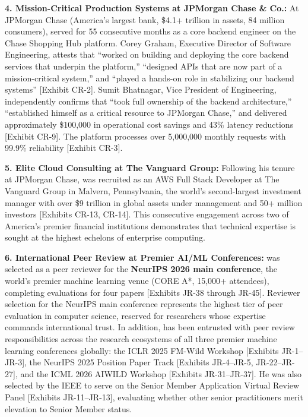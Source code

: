 \textbf{4. Mission-Critical Production Systems at JPMorgan Chase \& Co.:} At JPMorgan Chase (America's largest bank, \$4.1+ trillion in assets, 84 million consumers), \dr served for 55 consecutive months as a core backend engineer on the Chase Shopping Hub platform. Corey Graham, Executive Director of Software Engineering, attests that \dr ``worked on building and deploying the core backend services that underpin the platform,'' ``designed APIs that are now part of a mission-critical system,'' and ``played a hands-on role in stabilizing our backend systems'' [Exhibit CR-2]. Sumit Bhatnagar, Vice President of Engineering, independently confirms that \dr ``took full ownership of the backend architecture,'' ``established himself as a critical resource to JPMorgan Chase,'' and delivered approximately \$100,000 in operational cost savings and 43\% latency reductions [Exhibit CR-9]. The platform processes over 5,000,000 monthly requests with 99.9\% reliability [Exhibit CR-3].

\textbf{5. Elite Cloud Consulting at The Vanguard Group:} Following his tenure at JPMorgan Chase, \dr was recruited as an AWS Full Stack Developer at The Vanguard Group in Malvern, Pennsylvania, the world's second-largest investment manager with over \$9 trillion in global assets under management and 50+ million investors [Exhibits CR-13, CR-14]. This consecutive engagement across two of America's premier financial institutions demonstrates that \drs technical expertise is sought at the highest echelons of enterprise computing.

\textbf{6. International Peer Review at Premier AI/ML Conferences:} \dr was selected as a peer reviewer for the \textbf{NeurIPS 2026 main conference}, the world's premier machine learning venue (CORE A*, 15,000+ attendees), completing evaluations for four papers [Exhibits JR-38 through JR-45]. Reviewer selection for the NeurIPS main conference represents the highest tier of peer evaluation in computer science, reserved for researchers whose expertise commands international trust. In addition, \dr has been entrusted with peer review responsibilities across the research ecosystems of all three premier machine learning conferences globally: the ICLR 2025 FM-Wild Workshop [Exhibits JR-1--JR-3], the NeurIPS 2025 Position Paper Track [Exhibits JR-4--JR-5, JR-22--JR-27], and the ICML 2026 AIWILD Workshop [Exhibits JR-31--JR-37]. He was also selected by the IEEE to serve on the Senior Member Application Virtual Review Panel [Exhibits JR-11--JR-13], evaluating whether other senior practitioners merit elevation to Senior Member status.

